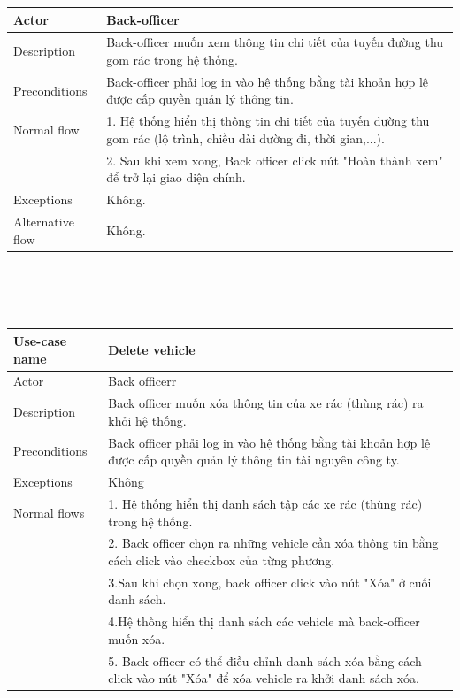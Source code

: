 \documentclass[a4paper]{article}
\begin{document}
\begin{enumerate}
\begin{enumerate}
\begin{tabular}{|p{3cm} |p{10cm} |}
         \hline 
         Actor & Back-officer \\
         \hline
         Description & Back-officer muốn xem thông tin chi tiết của tuyến đường thu gom rác trong hệ thống. \\
         \hline
         Preconditions & Back-officer phải log in vào hệ thống bằng tài khoản hợp lệ được cấp quyền quản lý thông tin. \\
         \hline
         Normal flow & 
         1. Hệ thống hiển thị thông tin chi tiết của tuyến đường thu gom rác (lộ trình, chiều dài dường đi, thời gian,...). \\
         &2. Sau khi xem xong, Back officer click nút "Hoàn thành xem" để trở lại giao diện chính. \\
         \hline
         Exceptions & Không. \\
         \hline
         Alternative flow & Không. \\
         \hline
    \end{tabular}
    \\ \\ \\
    \begin{tabular}{|p{3cm}|p{10cm}|}
         \hline
         Use-case name & \textbf{Delete vehicle} \\
         \hline
         Actor & Back officerr \\ 
         \hline
         Description & Back officer muốn xóa thông tin của xe rác (thùng rác) ra khỏi hệ thống. \\
         \hline
         Preconditions & Back officer phải log in vào hệ thống bằng tài khoản hợp lệ được cấp quyền quản lý thông tin tài nguyên công ty. \\
         \hline
         Exceptions & Không \\
         \hline
         Normal flows  
         &1. Hệ thống hiển thị danh sách tập các xe rác (thùng rác) trong hệ thống. \\
         &2. Back officer chọn ra những vehicle cần xóa thông tin bằng cách click vào checkbox của từng phương. \\
         &3.Sau khi chọn xong, back officer click vào nút "Xóa" ở cuối danh sách. \\
         &4.Hệ thống hiển thị danh sách các vehicle mà back-officer muốn xóa. \\
         &5. Back-officer có thể điều chỉnh danh sách xóa bằng cách click vào nút "Xóa" để xóa vehicle ra khởi danh sách xóa.\\

\end{tabular}
\end{enumerate}
\end{enumerate}
\end{document}
